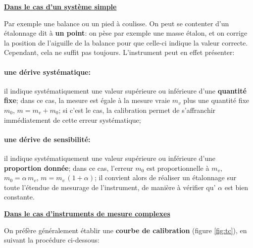 \begin{flushleft}
    \underline{\textbf{Dans le cas d'un système simple}}
\end{flushleft}
Par exemple une balance ou un pied à coulisse. On peut se contenter d'un étalonnage dit à \textbf{un point}: on pèse par exemple une masse étalon, et on corrige la position de l'aiguille de la balance pour que celle-ci indique la valeur correcte. Cependant, cela ne suffit pas toujours. L'instrument peut en effet présenter:
\paragraph{une dérive systématique:} il indique systématiquement une valeur supérieure ou inférieure d'une \textbf{quantité fixe}; dans ce cas, la mesure est égale à la mesure vraie $m_v$ plus une quantité fixe $m_0$, $m=m_v+m_0$; si c'est le cas, la calibration permet de s'affranchir immédiatement de cette erreur systématique;
\paragraph{une dérive de sensibilité:} il indique systématiquement une valeur supérieure ou inférieure d'une \textbf{proportion donnée}; dans ce cas, l'erreur $m_0$ est proportionnelle à $m_v$, $m_0=\alpha\,m_v$, $m=m_v\,(1+\alpha)$; il convient alors de réaliser un étalonnage sur toute l'étendue de mesurage de l'instrument, de manière à vérifier qu’ $\alpha$ est bien constante.

\begin{flushleft}
    \underline{\textbf{Dans le cas d'instruments de mesure complexes}}
\end{flushleft}
On préfère généralement établir une \textbf{courbe de calibration} (figure \ref{fig:tc}), en suivant la procédure ci-dessous:
